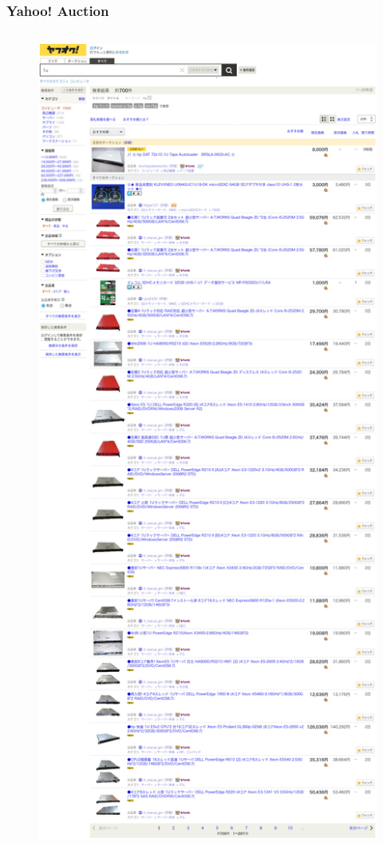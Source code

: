 \documentclass[aspectratio=169,11pt,hyperref={colorlinks=true}]{beamer}
\begin{document}
\begin{frame}
  \frametitle{Yahoo! Auction}
  \begin{columns}[T]
    \begin{column}{0.45\textwidth}
      \begin{figure}
        \begin{center}
          \includegraphics[width=1.0\textwidth]{yahoo_auction_1u.png}

\end{center}
\end{figure}
\end{column}
\end{columns}
\end{frame}
\end{document}
